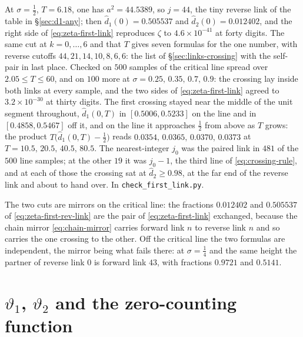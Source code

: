 \documentclass[11pt]{article}
\theoremstyle{definition}
\begin{document}
At $\sigma=\tfrac12$, $T=6.18$, one has $a^{2}=44.5389$, so $j=44$, the tiny
reverse link of the table in \S\ref{sec:d1-any}; then
$\hat d_1(0)=0.505537$ and $\hat d_2(0)=0.012402$, and the right side of
\eqref{eq:zeta-first-link} reproduces $\zeta$ to $4.6\times10^{-41}$ at forty
digits. The same cut at $k=0,\dots,6$ and that $T$ gives seven formulas for the
one number, with reverse cutoffs $44,21,14,10,8,6,6$: the list of
\S\ref{sec:links-crossing} with the self-pair in last place. Checked on $500$
samples of the critical line spread over $2.05\le T\le60$, and on $100$ more at
$\sigma=0.25,\,0.35,\,0.7,\,0.9$: the crossing lay inside both links at every
sample, and the two sides of \eqref{eq:zeta-first-link} agreed to
$3.2\times10^{-30}$ at thirty digits. The first crossing stayed near the middle
of the unit segment throughout, $\hat d_1(0,T)$ in $[0.5006,0.5233]$ on the line
and in $[0.4858,0.5467]$ off it, and on the line it approaches $\tfrac12$ from
above as $T$ grows: the product $T\bigl(\hat d_1(0,T)-\tfrac12\bigr)$ reads
$0.0354,\,0.0365,\,0.0370,\,0.0373$ at $T=10.5,\,20.5,\,40.5,\,80.5$. The
nearest-integer $j_0$ was the paired link in $481$ of the $500$ line samples;
at the other $19$ it was $j_0-1$, the third line of \eqref{eq:crossing-rule},
and at each of those the crossing sat at $\hat d_2\ge0.98$, at the far end of
the reverse link and about to hand over. In \texttt{check\_first\_link.py}.

The two cuts are mirrors on the critical line: the fractions $0.012402$ and
$0.505537$ of \eqref{eq:zeta-first-rev-link} are the pair of
\eqref{eq:zeta-first-link} exchanged, because the chain mirror
\eqref{eq:chain-mirror} carries forward link $n$ to reverse link $n$ and so
carries the one crossing to the other. Off the critical line the two formulas
are independent, the mirror being what fails there: at $\sigma=\tfrac14$ and
the same height the partner of reverse link $0$ is forward link $43$, with
fractions $0.9721$ and $0.5141$.

\clearpage

\section{\texorpdfstring{$\vartheta_1$, $\vartheta_2$}{theta1, theta2} and
the zero-counting function}\label{sec:counting}

\end{document}
